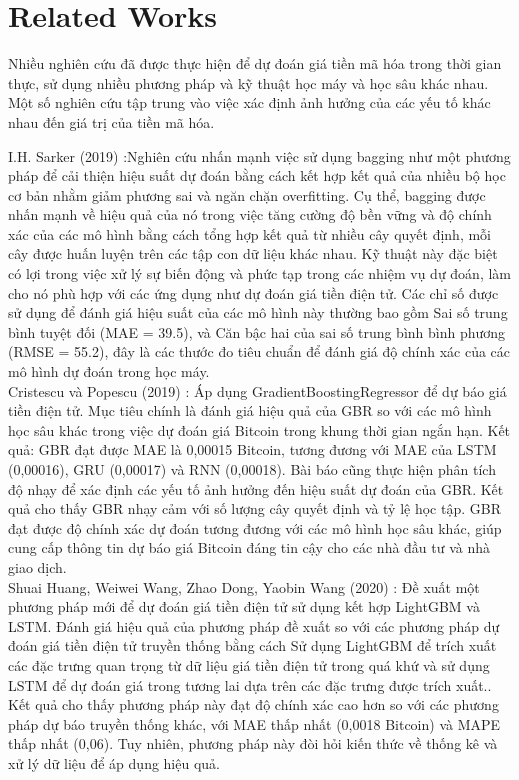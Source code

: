 \documentclass[conference]{IEEEtran}
\begin{document}
\section{Related Works}

Nhiều nghiên cứu đã được thực hiện để dự đoán giá tiền mã hóa trong thời gian thực, sử dụng nhiều phương pháp và kỹ thuật học máy và học sâu khác nhau. Một số nghiên cứu tập trung vào việc xác định ảnh hưởng của các yếu tố khác nhau đến giá trị của tiền mã hóa.

I.H. Sarker (2019) \cite{b8}:Nghiên cứu nhấn mạnh việc sử dụng bagging như một phương pháp để cải thiện hiệu suất dự đoán bằng cách kết hợp kết quả của nhiều bộ học cơ bản nhằm giảm phương sai và ngăn chặn overfitting. Cụ thể, bagging được nhấn mạnh về hiệu quả của nó trong việc tăng cường độ bền vững và độ chính xác của các mô hình bằng cách tổng hợp kết quả từ nhiều cây quyết định, mỗi cây được huấn luyện trên các tập con dữ liệu khác nhau. Kỹ thuật này đặc biệt có lợi trong việc xử lý sự biến động và phức tạp trong các nhiệm vụ dự đoán, làm cho nó phù hợp với các ứng dụng như dự đoán giá tiền điện tử. Các chỉ số được sử dụng để đánh giá hiệu suất của các mô hình này thường bao gồm Sai số trung bình tuyệt đối (MAE =  39.5), và Căn bậc hai của sai số trung bình bình phương (RMSE = 55.2), đây là các thước đo tiêu chuẩn để đánh giá độ chính xác của các mô hình dự đoán trong học máy. \\ 

Cristescu và Popescu (2019) \cite{b9}: Áp dụng GradientBoostingRegressor để dự báo giá tiền điện tử. Mục tiêu chính là đánh giá hiệu quả của GBR so với các mô hình học sâu khác trong việc dự đoán giá Bitcoin trong khung thời gian ngắn hạn. Kết quả: GBR đạt được MAE là 0,00015 Bitcoin, tương đương với MAE của LSTM (0,00016), GRU (0,00017) và RNN (0,00018). Bài báo cũng thực hiện phân tích độ nhạy để xác định các yếu tố ảnh hưởng đến hiệu suất dự đoán của GBR. Kết quả cho thấy GBR nhạy cảm với số lượng cây quyết định và tỷ lệ học tập. GBR đạt được độ chính xác dự đoán tương đương với các mô hình học sâu khác, giúp cung cấp thông tin dự báo giá Bitcoin đáng tin cậy cho các nhà đầu tư và nhà giao dịch. \\ 

Shuai Huang, Weiwei Wang, Zhao Dong, Yaobin Wang (2020) \cite{b10}: Đề xuất một phương pháp mới để dự đoán giá tiền điện tử sử dụng kết hợp LightGBM và LSTM. Đánh giá hiệu quả của phương pháp đề xuất so với các phương pháp dự đoán giá tiền điện tử truyền thống bằng cách Sử dụng LightGBM để trích xuất các đặc trưng quan trọng từ dữ liệu giá tiền điện tử trong quá khứ và sử dụng LSTM để dự đoán giá trong tương lai dựa trên các đặc trưng được trích xuất.. Kết quả cho thấy phương pháp này đạt độ chính xác cao hơn so với các phương pháp dự báo truyền thống khác, với MAE thấp nhất (0,0018 Bitcoin) và MAPE thấp nhất (0,06). Tuy nhiên, phương pháp này đòi hỏi kiến thức về thống kê và xử lý dữ liệu để áp dụng hiệu quả. \\
\end{document}

